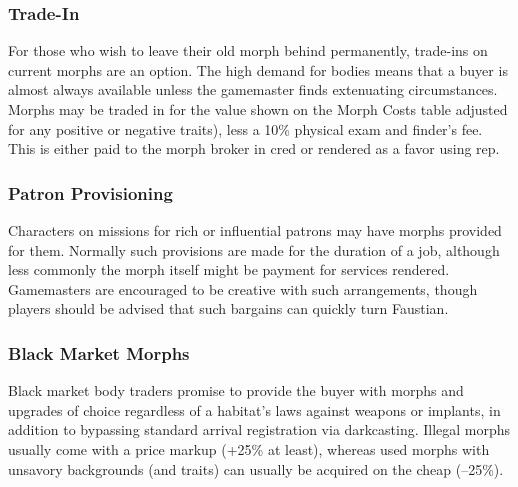 \subsubsection{Trade-In} 

For those who wish to leave their old morph behind permanently, trade-ins on current morphs are an option. The high demand for bodies means that a buyer is almost always available unless the gamemaster finds extenuating circumstances. Morphs may be traded in for the value shown on the Morph Costs table adjusted for any positive or negative traits), less a 10\% physical exam and finder's fee. This is either paid to the morph broker in cred or rendered as a favor using rep. 

\subsubsection{Patron Provisioning} 

Characters on missions for rich or influential patrons may have morphs provided for them. Normally such provisions are made for the duration of a job, although less commonly the morph itself might be payment for services rendered. Gamemasters are encouraged to be creative with such arrangements, though players should be advised that such bargains can quickly turn Faustian. 

\subsubsection{Black Market Morphs} 

Black market body traders promise to provide the buyer with morphs and upgrades of choice regardless of a habitat's laws against weapons or implants, in addition to bypassing standard arrival registration via darkcasting. Illegal morphs usually come with a price markup (+25\% at least), whereas used morphs with unsavory backgrounds (and traits) can usually be acquired on the cheap (–25\%). 

